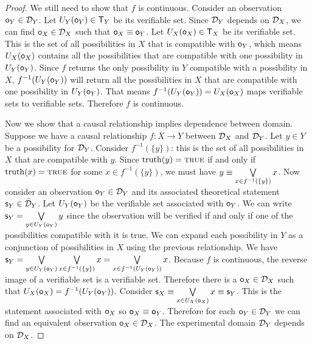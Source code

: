 \documentclass[11pt,letterpaper,fleqn]{memoir} %
\begin{document}
\begin{mathSection}
\begin{proof}
		We still need to show that $f$ is continuous. Consider an observation $\mathsf{o}_Y \in \mathcal{D}_Y$. Let $U_Y(\mathsf{o}_Y) \in \mathsf{T}_Y$ be its verifiable set. Since $\mathcal{D}_Y$ depends on $\mathcal{D}_X$, we can find $\mathsf{o}_X \in \mathcal{D}_X$ such that $\mathsf{o}_X \equiv \mathsf{o}_Y$. Let $U_X(\mathsf{o}_X) \in \mathsf{T}_X$ be its verifiable set. This is the set of all possibilities in $X$ that is compatible with $\mathsf{o}_Y$, which means $U_X(\mathsf{o}_X)$ contains all the possibilities that are compatible with one possibility in $U_Y(\mathsf{o}_Y)$. Since $f$ returns the only possibility in $Y$ compatible with a possibility in $X$, $f^{-1}(U_Y(\mathsf{o}_Y))$ will return all the possibilities in $X$ that are compatible with one possibility in $U_Y(\mathsf{o}_Y)$. That means $f^{-1}(U_Y(\mathsf{o}_Y)) = U_X(\mathsf{o}_X)$ maps verifiable sets to verifiable sets. Therefore $f$ is continuous.
		
		Now we show that a causal relationship implies dependence between domain. Suppose we have a causal relationship $f: X \to Y$ between $\mathcal{D}_X$ and $\mathcal{D}_Y$. Let $y \in Y$ be a possibility for $\mathcal{D}_Y$. Consider   $f^{-1}(\{y\})$: this is the set of all possibilities in $X$ that are compatible with $y$. Since $\operatorname{truth}(y)=\textsc{true}$ if and only if $\operatorname{truth}(x)=\textsc{true}$ for some $x \in f^{-1}(\{y\})$, we must have $y \equiv \bigvee\limits_{x \in f^{-1}(\{y\})} x$. Now consider an observation $\mathsf{o}_Y \in \mathcal{D}_Y$ and its associated theoretical statement $\mathsf{s}_Y \in \bar{\mathcal{D}}_Y$. Let $U_Y(\mathsf{o}_Y)$ be the verifiable set associated with $\mathsf{o}_Y$. We can write $\mathsf{s}_Y = \bigvee\limits_{y \in U_Y(\mathsf{o}_Y)} y$ since the observation will be verified if and only if one of the possibilities compatible with it is true. We can expand each possibility in $Y$ as a conjunction of possibilities in $X$ using the previous relationship. We have $\mathsf{s}_Y = \bigvee\limits_{y \in U_Y(\mathsf{o}_Y)} \bigvee\limits_{x \in f^{-1}(\{y\})} x = \bigvee\limits_{x \in f^{-1}(U_Y(\mathsf{o}_Y))} x$. Because $f$ is continuous, the reverse image of a verifiable set is a verifiable set. Therefore there is a $\mathsf{o}_X \in \mathcal{D}_X$ such that $U_X(\mathsf{o}_X) = f^{-1}(U_Y(\mathsf{o}_Y))$. Consider $\mathsf{s}_X \equiv \bigvee\limits_{x \in U_X(\mathsf{o}_X)} x \equiv \mathsf{s}_Y$. This is the statement associated with $\mathsf{o}_X$ so $\mathsf{o}_X \equiv \mathsf{o}_Y$. Therefore for each $\mathsf{o}_Y \in \mathcal{D}_Y$ we can find an equivalent observation $\mathsf{o}_X \in \mathcal{D}_X$. The experimental domain $\mathcal{D}_Y$ depends on $\mathcal{D}_X$.
	\end{proof}
\end{mathSection}
\end{document}

